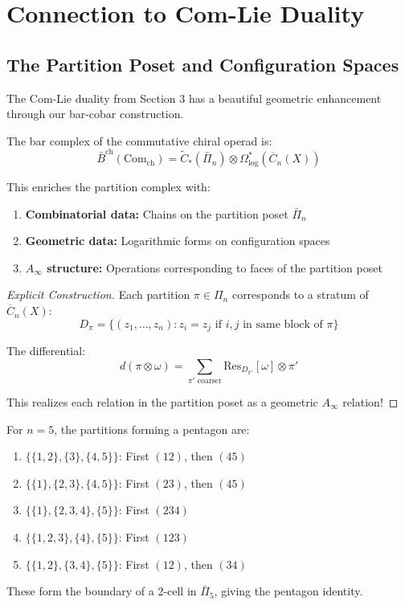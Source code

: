\section{Connection to Com-Lie Duality}

\subsection{The Partition Poset and Configuration Spaces}

The Com-Lie duality from Section 3 has a beautiful geometric enhancement through our bar-cobar construction.

\begin{theorem}
The bar complex of the commutative chiral operad is:
$$\bar{B}^{\text{ch}}(\text{Com}_{\text{ch}}) = \tilde{C}_*(\bar{\Pi}_n) \otimes \Omega^*_{\text{log}}(\overline{C}_n(X))$$

This enriches the partition complex with:
\begin{enumerate}
\item \textbf{Combinatorial data:} Chains on the partition poset $\bar{\Pi}_n$
\item \textbf{Geometric data:} Logarithmic forms on configuration spaces
\item \textbf{$A_\infty$ structure:} Operations corresponding to faces of the partition poset
\end{enumerate}
\end{theorem}

\begin{proof}[Explicit Construction]
Each partition $\pi \in \Pi_n$ corresponds to a stratum of $\overline{C}_n(X)$:
$$D_\pi = \{(z_1, \ldots, z_n) : z_i = z_j \text{ if } i,j \text{ in same block of } \pi\}$$

The differential:
$$d(\pi \otimes \omega) = \sum_{\pi' \text{ coarser}} \text{Res}_{D_{\pi'}}[\omega] \otimes \pi'$$

This realizes each relation in the partition poset as a geometric $A_\infty$ relation!
\end{proof}

\begin{example}
For $n=5$, the partitions forming a pentagon are:
\begin{enumerate}
\item $\{\{1,2\},\{3\},\{4,5\}\}$: First $(12)$, then $(45)$
\item $\{\{1\},\{2,3\},\{4,5\}\}$: First $(23)$, then $(45)$
\item $\{\{1\},\{2,3,4\},\{5\}\}$: First $(234)$
\item $\{\{1,2,3\},\{4\},\{5\}\}$: First $(123)$
\item $\{\{1,2\},\{3,4\},\{5\}\}$: First $(12)$, then $(34)$
\end{enumerate}

These form the boundary of a 2-cell in $\bar{\Pi}_5$, giving the pentagon identity.
\end{example}

